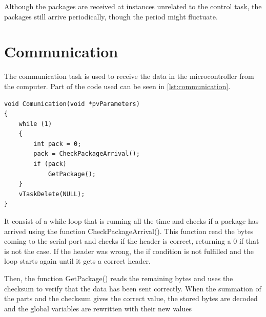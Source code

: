 Although the packages are received at instances unrelated to the control task, the packages still arrive periodically, though the period might fluctuate.

\section{Communication}
The communication task is used to receive the data in the microcontroller from the computer. Part of the code used can be seen in \autoref{lst:communication}.

\begin{lstlisting}[style=customcpp,
                caption={Code for the comunication task.}, 
                label=lst:communication]
void Comunication(void *pvParameters)
{
    while (1)
    {
        int pack = 0;
        pack = CheckPackageArrival();
        if (pack)
            GetPackage();
    }
    vTaskDelete(NULL);
}
\end{lstlisting}

It consist of a while loop that is running all the time and checks if a package has arrived using the function CheckPackageArrival(). This function read the bytes coming to the serial port and checks if the header is correct, returning a 0 if that is not the case. If the header was wrong, the if condition is not fulfilled and the loop starts again until it gets a correct header.

Then, the function GetPackage() reads the remaining bytes and uses the checksum to verify that the data has been sent correctly. When the summation of the parts and the checksum gives the correct value, the stored bytes are decoded and the global variables are rewritten with their new values


